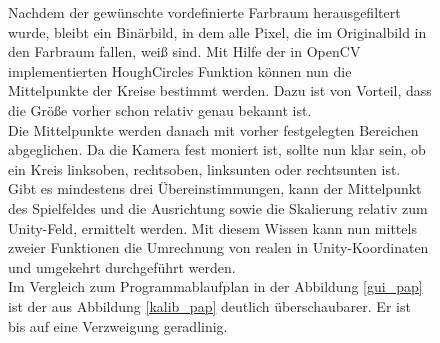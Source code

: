 \begin{figure} [h]
\begin{minipage}[t]{0.5\textwidth}
\vspace{0pt}

Nachdem der gewünschte vordefinierte Farbraum herausgefiltert wurde, bleibt ein Binärbild, in dem alle Pixel, die im Originalbild in den Farbraum fallen, weiß sind. Mit Hilfe der in OpenCV implementierten HoughCircles Funktion \cite{rhody2005lecture} können nun die Mittelpunkte der Kreise bestimmt werden. Dazu ist von Vorteil, dass die Größe vorher schon relativ genau bekannt ist. \\ 
Die Mittelpunkte werden danach mit vorher festgelegten Bereichen abgeglichen. Da die Kamera fest moniert ist, sollte nun klar sein, ob ein Kreis linksoben, rechtsoben, linksunten oder rechtsunten ist. Gibt es mindestens drei Übereinstimmungen, kann der Mittelpunkt des Spielfeldes und die Ausrichtung sowie die Skalierung relativ zum Unity-Feld, ermittelt werden. Mit diesem Wissen kann nun mittels zweier Funktionen die Umrechnung von realen in Unity-Koordinaten und umgekehrt durchgeführt werden.\\
Im Vergleich zum Programmablaufplan in der Abbildung \ref{gui_pap} ist der aus Abbildung \ref{kalib_pap} deutlich überschaubarer. Er ist bis auf eine Verzweigung geradlinig.
\end{minipage}
\hspace{0.1\textwidth}
\begin{minipage}[t]{0.3\textwidth}
\vspace{0pt}

\end{minipage}
\end{figure}
